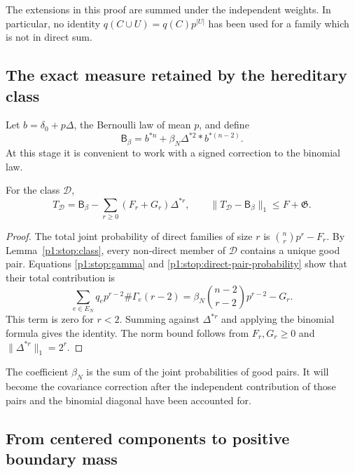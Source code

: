 The extensions in this proof are summed under the independent
weights.  In particular, no identity
$q(C\cup U)=q(C)p^{|U|}$ has been used for a family which is
not in direct sum.

\subsection{The exact measure retained by the hereditary class}

Let $b=\delta_0+p\Delta$, the Bernoulli law of mean $p$, and
define
\begin{equation}
 \mathsf B_\beta=b^{*n}
          +\beta_N\Delta^{*2}*b^{*(n-2)}.
 \label{p1:close:bernoulli-reference}
\end{equation}
At this stage it is convenient to work with a signed correction
to the binomial law.

\begin{proposition}
\label{p1:close:retained-reference}
For the class $\mathscr D$,
\begin{equation}
 T_{\mathscr D}
 =\mathsf B_\beta-\sum_{r\ge0}(F_r+G_r)\Delta^{*r},
 \qquad
 \|T_{\mathscr D}-\mathsf B_\beta\|_1\le F+\mathfrak G.
 \label{p1:close:retained-identity}
\end{equation}
\end{proposition}

\begin{proof}
The total joint probability of direct families of size $r$ is
$\binom nrp^r-F_r$.
By Lemma~\ref{p1:stop:class}, every non-direct member of
$\mathscr D$ contains a unique good pair.  Equations
\eqref{p1:stop:gamma} and \eqref{p1:stop:direct-pair-probability}
show that their total contribution is
\[
 \sum_{e\in E_N}q_ep^{r-2}\#\Gamma_e(r-2)
   =\beta_N\binom{n-2}{r-2}p^{r-2}-G_r.
\]
This term is zero for $r<2$.  Summing against
$\Delta^{*r}$ and applying the binomial formula gives the
identity.  The norm bound follows from
$F_r,G_r\ge0$ and $\|\Delta^{*r}\|_1=2^r$.
\end{proof}

The coefficient $\beta_N$ is the sum of the joint probabilities
of good pairs.  It will become the covariance correction after
the independent contribution of those pairs and the binomial
diagonal have been accounted for.

\subsection{From centered components to positive boundary mass}

